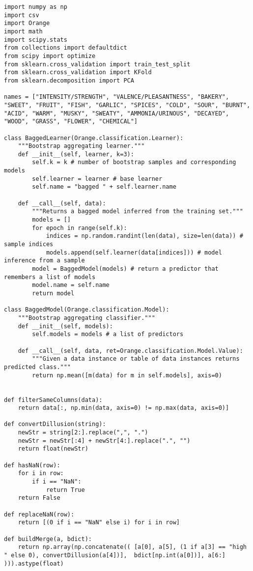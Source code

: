 \documentclass[a4paper,11pt]{article}
\begin{document}
\begin{lstlisting}
import numpy as np
import csv
import Orange
import math
import scipy.stats
from collections import defaultdict
from scipy import optimize
from sklearn.cross_validation import train_test_split
from sklearn.cross_validation import KFold
from sklearn.decomposition import PCA

names = ["INTENSITY/STRENGTH", "VALENCE/PLEASANTNESS", "BAKERY", "SWEET", "FRUIT", "FISH", "GARLIC", "SPICES", "COLD", "SOUR", "BURNT", "ACID", "WARM", "MUSKY", "SWEATY", "AMMONIA/URINOUS", "DECAYED", "WOOD", "GRASS", "FLOWER", "CHEMICAL"]

class BaggedLearner(Orange.classification.Learner):
    """Bootstrap aggregating learner."""
    def __init__(self, learner, k=3):
        self.k = k # number of bootstrap samples and corresponding models
        self.learner = learner # base learner
        self.name = "bagged " + self.learner.name

    def __call__(self, data):
        """Returns a bagged model inferred from the training set."""
        models = []
        for epoch in range(self.k):
            indices = np.random.randint(len(data), size=len(data)) # sample indices
            models.append(self.learner(data[indices])) # model inference from a sample
        model = BaggedModel(models) # return a predictor that remembers a list of models
        model.name = self.name
        return model

class BaggedModel(Orange.classification.Model):
    """Bootstrap aggregating classifier."""
    def __init__(self, models):
        self.models = models # a list of predictors

    def __call__(self, data, ret=Orange.classification.Model.Value):
        """Given a data instance or table of data instances returns predicted class."""
        return np.mean([m(data) for m in self.models], axis=0)


def filterSameColumns(data):
    return data[:, np.min(data, axis=0) != np.max(data, axis=0)]

def convertDillusion(string):
    newStr = string[2:].replace(",", ".")
    newStr = newStr[:4] + newStr[4:].replace(".", "")
    return float(newStr)

def hasNaN(row):
    for i in row:
        if i == "NaN":
            return True
    return False

def replaceNaN(row):
    return [(0 if i == "NaN" else i) for i in row]

def buildMerge(a, bdict):
    return np.array(np.concatenate(( [a[0], a[5], (1 if a[3] == "high " else 0), convertDillusion(a[4])],  bdict[np.int(a[0])], a[6:] ))).astype(float)


\end{lstlisting}
\end{document}
